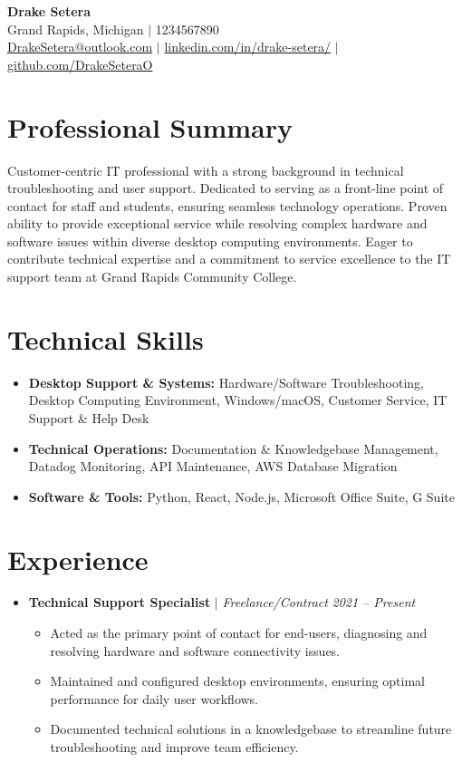 \documentclass[10pt,letterpaper]{article}
\begin{document}
\begin{center}
    {\Huge \textbf{Drake Setera}} \\
    \vspace{4pt}
    Grand Rapids, Michigan $|$ 1234567890 \\
    \href{mailto:DrakeSetera@outlook.com}{DrakeSetera@outlook.com} $|$ \href{https://www.linkedin.com/in/drake-setera/}{linkedin.com/in/drake-setera/} $|$ \href{https://github.com/DrakeSeteraO}{github.com/DrakeSeteraO}
\end{center}

\section{Professional Summary}
Customer-centric IT professional with a strong background in technical troubleshooting and user support. Dedicated to serving as a front-line point of contact for staff and students, ensuring seamless technology operations. Proven ability to provide exceptional service while resolving complex hardware and software issues within diverse desktop computing environments. Eager to contribute technical expertise and a commitment to service excellence to the IT support team at Grand Rapids Community College.

\section{Technical Skills}
\begin{itemize}[leftmargin=0.15in, label={}]
    \item \textbf{Desktop Support \& Systems:} Hardware/Software Troubleshooting, Desktop Computing Environment, Windows/macOS, Customer Service, IT Support \& Help Desk
    \item \textbf{Technical Operations:} Documentation \& Knowledgebase Management, Datadog Monitoring, API Maintenance, AWS Database Migration
    \item \textbf{Software \& Tools:} Python, React, Node.js, Microsoft Office Suite, G Suite
\end{itemize}

\section{Experience}
\begin{itemize}[leftmargin=0.15in, label={}]
    \item \textbf{Technical Support Specialist} $|$ \textit{Freelance/Contract} \hfill \textit{2021 -- Present}
    \begin{itemize}
        \item Acted as the primary point of contact for end-users, diagnosing and resolving hardware and software connectivity issues.
        \item Maintained and configured desktop environments, ensuring optimal performance for daily user workflows.
        \item Documented technical solutions in a knowledgebase to streamline future troubleshooting and improve team efficiency.
    \end{itemize}
\end{itemize}
\end{document}
